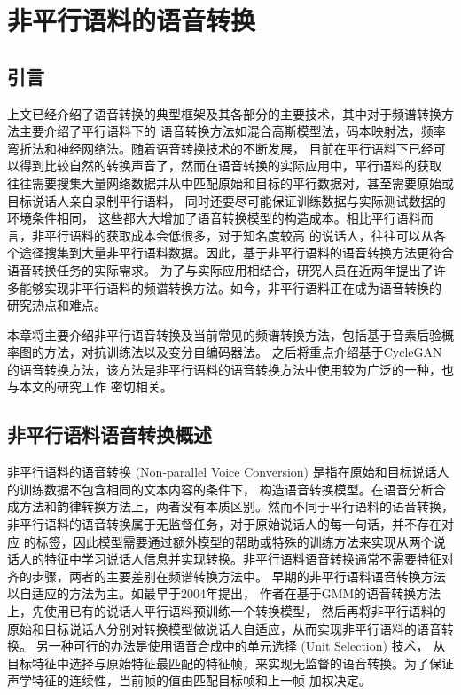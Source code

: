 \chapter{非平行语料的语音转换}

\section{引言}
上文已经介绍了语音转换的典型框架及其各部分的主要技术，其中对于频谱转换方法主要介绍了平行语料下的
语音转换方法如混合高斯模型法，码本映射法，频率弯折法和神经网络法。随着语音转换技术的不断发展，
目前在平行语料下已经可以得到比较自然的转换声音了，然而在语音转换的实际应用中，平行语料的获取
往往需要搜集大量网络数据并从中匹配原始和目标的平行数据对，甚至需要原始或目标说话人亲自录制平行语料，
同时还要尽可能保证训练数据与实际测试数据的环境条件相同，
这些都大大增加了语音转换模型的构造成本。相比平行语料而言，非平行语料的获取成本会低很多，对于知名度较高
的说话人，往往可以从各个途径搜集到大量非平行语料数据。因此，基于非平行语料的语音转换方法更符合语音转换任务的实际需求。
为了与实际应用相结合，研究人员在近两年提出了许多能够实现非平行语料的频谱转换方法。如今，非平行语料正在成为语音转换的
研究热点和难点。

本章将主要介绍非平行语音转换及当前常见的频谱转换方法，包括基于音素后验概率图的方法，对抗训练法以及变分自编码器法。
之后将重点介绍基于CycleGAN的语音转换方法，该方法是非平行语料的语音转换方法中使用较为广泛的一种，也与本文的研究工作
密切相关。

\section{非平行语料语音转换概述}
非平行语料的语音转换 (Non-parallel Voice Conversion) 是指在原始和目标说话人的训练数据不包含相同的文本内容的条件下，
构造语音转换模型。在语音分析合成方法和韵律转换方法上，两者没有本质区别。然而不同于平行语料的语音转换，非平行语料的语音转换属于无监督任务，对于原始说话人的每一句话，并不存在对应
的标签，因此模型需要通过额外模型的帮助或特殊的训练方法来实现从两个说话人的特征中学习说话人信息并实现转换。非平行语料语音转换通常不需要特征对齐的步骤，两者的主要差别在频谱转换方法中。
早期的非平行语料语音转换方法以自适应的方法为主\cite{mouchtaris2004non,lee2006map}。如最早于2004年提出\cite{mouchtaris2004non}，
作者在基于GMM的语音转换方法上，先使用已有的说话人平行语料预训练一个转换模型，
然后再将非平行语料的原始和目标说话人分别对转换模型做说话人自适应，从而实现非平行语料的语音转换。
另一种可行的办法是使用语音合成中的单元选择 (Unit Selection) 技术\cite{sundermann2006text}，
从目标特征中选择与原始特征最匹配的特征帧，来实现无监督的语音转换。为了保证声学特征的连续性，当前帧的值由匹配目标帧和上一帧
加权决定。


